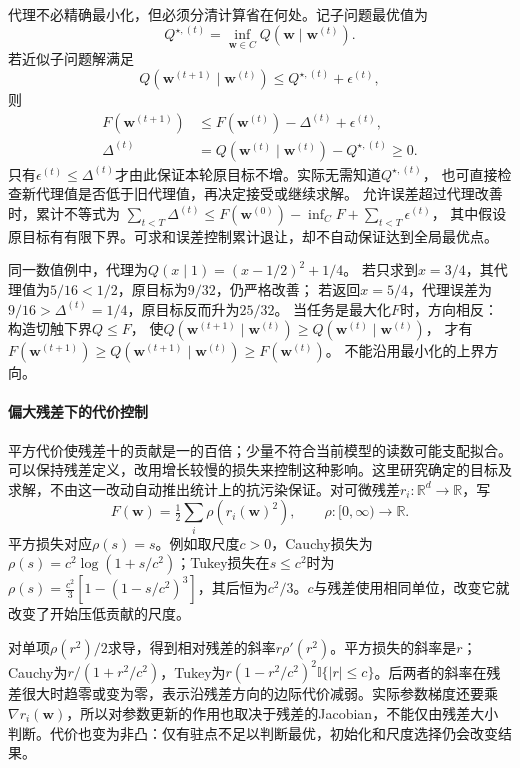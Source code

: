 代理不必精确最小化，但必须分清计算省在何处。记子问题最优值为
\[
 Q^{\star,(t)}=\inf_{\bm w\in C}Q(\bm w\mid\bm w^{(t)}).
\]
若近似子问题解满足
\[
 Q(\bm w^{(t+1)}\mid\bm w^{(t)})\leq Q^{\star,(t)}+\epsilon^{(t)},
\]
则
\[
 \begin{aligned}
 F(\bm w^{(t+1)})&\leq F(\bm w^{(t)})-\Delta^{(t)}+\epsilon^{(t)},\\
 \Delta^{(t)}&=Q(\bm w^{(t)}\mid\bm w^{(t)})-Q^{\star,(t)}\geq0.
 \end{aligned}
\]
只有$\epsilon^{(t)}\leq\Delta^{(t)}$才由此保证本轮原目标不增。实际无需知道$Q^{\star,(t)}$，
也可直接检查新代理值是否低于旧代理值，再决定接受或继续求解。
允许误差超过代理改善时，累计不等式为
$\sum_{t<T}\Delta^{(t)}\leq F(\bm w^{(0)})-\inf_C F+\sum_{t<T}\epsilon^{(t)}$，
其中假设原目标有有限下界。可求和误差控制累计退让，却不自动保证达到全局最优点。

同一数值例中，代理为$Q(x\mid1)=(x-1/2)^2+1/4$。
若只求到$x=3/4$，其代理值为$5/16<1/2$，原目标为$9/32$，仍严格改善；
若返回$x=5/4$，代理误差为$9/16>\Delta^{(t)}=1/4$，原目标反而升为$25/32$。
当任务是最大化$F$时，方向相反：构造切触下界$Q\leq F$，
使$Q(\bm w^{(t+1)}\mid\bm w^{(t)})\geq Q(\bm w^{(t)}\mid\bm w^{(t)})$，
才有$F(\bm w^{(t+1)})\geq Q(\bm w^{(t+1)}\mid\bm w^{(t)})\geq F(\bm w^{(t)})$。
不能沿用最小化的上界方向。

\paragraph{偏大残差下的代价控制}
\label{sec:opt-robust-residual-objectives}

平方代价使残差十的贡献是一的百倍；少量不符合当前模型的读数可能支配拟合。可以保持残差定义，改用增长较慢的损失来控制这种影响。这里研究确定的目标及求解，不由这一改动自动推出统计上的抗污染保证。对可微残差$r_i:\mathbb R^d\to\mathbb R$，写
\[
 F(\bm w)=\tfrac12\sum_i\rho(r_i(\bm w)^2),
 \qquad \rho:[0,\infty)\to\mathbb R.
\]
平方损失对应$\rho(s)=s$。例如取尺度$c>0$，Cauchy损失为$\rho(s)=c^2\log(1+s/c^2)$；Tukey损失在$s\leq c^2$时为$\rho(s)=\tfrac{c^2}{3}[1-(1-s/c^2)^3]$，其后恒为$c^2/3$。$c$与残差使用相同单位，改变它就改变了开始压低贡献的尺度。

对单项$\rho(r^2)/2$求导，得到相对残差的斜率$r\rho'(r^2)$。平方损失的斜率是$r$；Cauchy为$r/(1+r^2/c^2)$，Tukey为$r(1-r^2/c^2)^2\mathbb I\{|r|\leq c\}$。后两者的斜率在残差很大时趋零或变为零，表示沿残差方向的边际代价减弱。实际参数梯度还要乘$\nabla r_i(\bm w)$，所以对参数更新的作用也取决于残差的Jacobian，不能仅由残差大小判断。代价也变为非凸：仅有驻点不足以判断最优，初始化和尺度选择仍会改变结果。

